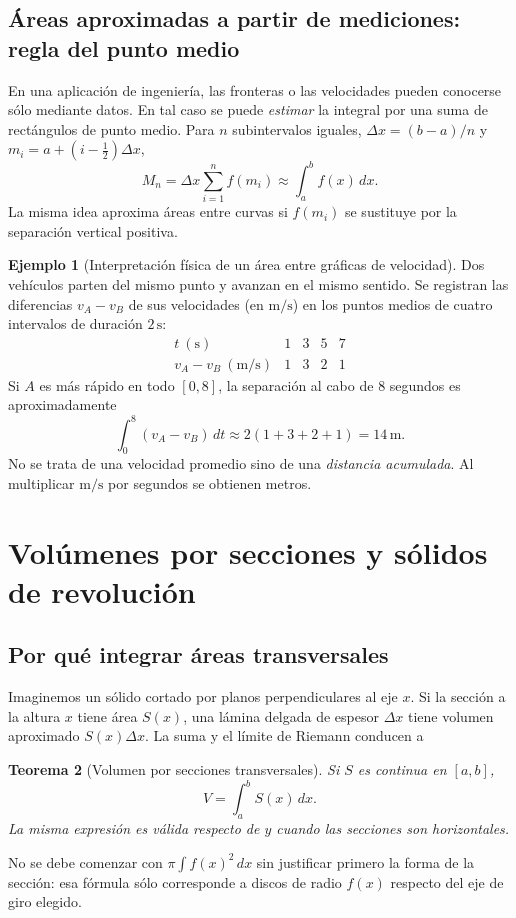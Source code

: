 \documentclass[12pt]{article}
\newtheorem{teorema}{Teorema}[section]
\theoremstyle{definition}
\newtheorem{ejemplo}[teorema]{Ejemplo}
\theoremstyle{remark}
\newcommand{\dd}{\,dx}
\begin{document}
\subsection*{Áreas aproximadas a partir de mediciones: regla del punto medio}
En una aplicación de ingeniería, las fronteras o las velocidades pueden conocerse sólo mediante datos. En tal caso se puede \emph{estimar} la integral por una suma de rectángulos de punto medio. Para $n$ subintervalos iguales, $\Delta x=(b-a)/n$ y $m_i=a+(i-\tfrac12)\Delta x$,
\[
M_n=\Delta x\sum_{i=1}^n f(m_i)\approx\int_a^b f(x)\,dx.
\]
La misma idea aproxima áreas entre curvas si $f(m_i)$ se sustituye por la separación vertical positiva.
\begin{ejemplo}[Interpretación física de un área entre gráficas de velocidad]
Dos vehículos parten del mismo punto y avanzan en el mismo sentido. Se registran las diferencias $v_A-v_B$ de sus velocidades (en $\mathrm{m/s}$) en los puntos medios de cuatro intervalos de duración $2\,\mathrm s$:
\[
\begin{array}{c|cccc}
t\ (\mathrm s) &1&3&5&7\\ \hline
v_A-v_B\ (\mathrm{m/s}) &1&3&2&1
\end{array}
\]
Si $A$ es más rápido en todo $[0,8]$, la separación al cabo de $8$ segundos es aproximadamente
\[
\int_0^8(v_A-v_B)\,dt\approx2(1+3+2+1)=\boxed{14\,\mathrm m}.
\]
No se trata de una velocidad promedio sino de una \emph{distancia acumulada}. Al multiplicar $\mathrm{m/s}$ por segundos se obtienen metros.
\end{ejemplo}



\section{Volúmenes por secciones y sólidos de revolución}
\subsection*{Por qué integrar áreas transversales}
Imaginemos un sólido cortado por planos perpendiculares al eje $x$. Si la sección a la altura $x$ tiene área $S(x)$, una lámina delgada de espesor $\Delta x$ tiene volumen aproximado $S(x)\Delta x$. La suma y el límite de Riemann conducen a
\begin{teorema}[Volumen por secciones transversales]
Si $S$ es continua en $[a,b]$,
\[\boxed{V=\int_a^b S(x)\dd.}\]
La misma expresión es válida respecto de $y$ cuando las secciones son horizontales.
\end{teorema}
No se debe comenzar con $\pi\int f(x)^2\dd$ sin justificar primero la forma de la sección: esa fórmula sólo corresponde a discos de radio $f(x)$ respecto del eje de giro elegido.
\end{document}
